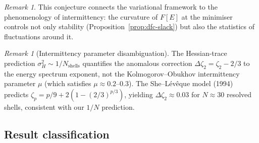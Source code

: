 \documentclass[12pt,a4paper]{article}
\theoremstyle{definition}
\theoremstyle{plain}
\theoremstyle{remark}
\newtheorem{remark}[definition]{Remark}
\begin{document}
\begin{remark}
This conjecture connects the variational framework to the phenomenology of intermittency: the curvature of $F[E]$ at the minimiser controls not only stability (Proposition~\ref{prop:dfc-slack}) but also the statistics of fluctuations around it.
\end{remark}

\begin{remark}[Intermittency parameter disambiguation]\label{rem:mu-disambiguation}
The Hessian-trace prediction $\sigma_H^2 \sim 1/N_{\mathrm{shells}}$ quantifies the anomalous correction $\Delta\zeta_2 = \zeta_2 - 2/3$ to the energy spectrum exponent, not the Kolmogorov--Obukhov intermittency parameter $\mu$ (which satisfies $\mu \approx 0.2$--$0.3$). The She--L\'ev\^eque model (1994) predicts $\zeta_p = p/9 + 2(1 - (2/3)^{p/3})$, yielding $\Delta\zeta_2 \approx 0.03$ for $N \approx 30$ resolved shells, consistent with our $1/N$ prediction.
\end{remark}

\subsection*{Result classification}
\end{document}
